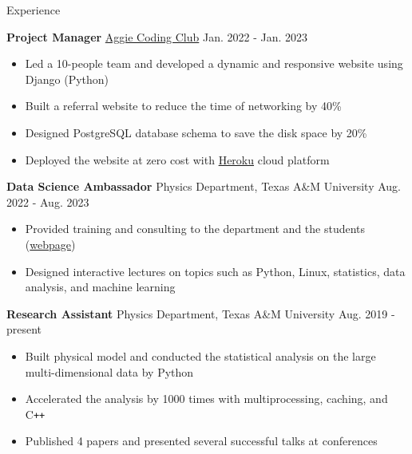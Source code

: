 \documentclass{resume}
\begin{document}
\begin{rSection}{Experience}
    \vspace{-1.5em}
    \item \textbf{Project Manager} \href{https://aggiecodingclub.com}{Aggie Coding Club} \hfill Jan. 2022 - Jan. 2023
        \begin{itemize}
        \itemsep -3pt {}
        \item Led a 10-people team and developed a dynamic and responsive website using Django (Python)
        \item Built a referral website to reduce the time of networking by 40\%
        \item Designed PostgreSQL database schema to save the disk space by 20\%
        \item Deployed the website at zero cost with \href{https://www.heroku.com}{Heroku} cloud platform
        \end{itemize}

    \item \textbf{Data Science Ambassador} Physics Department, Texas A\&M University \hfill Aug. 2022 - Aug. 2023
        \begin{itemize}
        \itemsep -3pt {}
        \item Provided training and consulting to the department and the students (\href{https://noctildon.github.io/DS_ambassador/index.html}{webpage})
        \item Designed interactive lectures on topics such as Python, Linux, statistics, data analysis, and machine learning
        \end{itemize}

    \item \textbf{Research Assistant} Physics Department, Texas A\&M University \hfill Aug. 2019 - present
        \begin{itemize}
        \itemsep -3pt {}
        \item Built physical model and conducted the statistical analysis on the large multi-dimensional data by Python
        \item Accelerated the analysis by 1000 times with multiprocessing, caching, and C\texttt{++}
        \item Published 4 papers and presented several successful talks at conferences
        \end{itemize}
\end{rSection}
\end{document}
